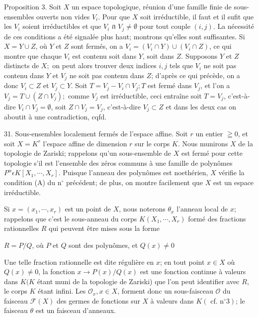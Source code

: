 Proposition $3 .$ Soit $X$ un espace topologique, réunion d'une famille finie de sous-ensembles ouverts non vides $V_{i} .$ Pour que $X$ soit irréductible, il faut et il sufit que les $V_{i}$ soient irréductibles et que $V_{i}$ ก $V_{j} \neq \emptyset$ pour tout couple $(i, j)$. La nécessité de ces conditions a été signalée plus haut; montrons qu'elles sont suffisantes. Si $X=Y \cup Z$, où $Y$ et $Z$ sont fermés, on a $V_{i}=\left(V_{i} \cap Y\right) \cup\left(V_{i} \cap Z\right)$, ce qui montre que chaque $V_{i}$ est contenu soit dans $Y$, soit dans $Z$. Supposons $Y$ et $Z$ distincts de $X ;$ on peut alors trouver deux indices $i, j$ tels que $V_{i}$ ne soit pas contenu dans $Y$ et $V_{j}$ ne soit pas contenu dans $Z$; d'après ce qui précède, on a donc $V_{i} \subset Z$ et $V_{j} \subset Y$. Soit $T=V_{j}-V_{i} \cap V_{j} ; T$ est fermé dans $V_{j}$, et l'on a $V_{j}=T \cup\left(Z \cap V_{j}\right) ;$ comme $V_{j}$ est irréductible, ceci entraîne soit $T=V_{j}$, c'est-à-dire $V_{i} \cap V_{j}=\emptyset$, soit $Z \cap V_{j}=V_{j}$, c'est-à-dire $V_{j} \subset Z$ et dans les deux cas on aboutit à une contradiction, cqfd.

31. Sous-ensembles localement fermés de l'espace affine. Soit $r$ un entier $\geqq 0$, et soit $X=K^{r}$ l'espace affine de dimension $r$ sur le corps $K$. Nous munirons $X$ de la topologie de Zariski; rappelons qu'un sous-ensemble de $X$ est fermé pour cette topologie s'il est l'ensemble des zéros communs à une famille de polynômes $P^{\alpha} \epsilon K\left[X_{1}, \cdots, X_{r}\right] .$ Puisque l'anneau des polynômes est noethérien, $X$ vérifie la condition (A) du $\mathrm{n}^{\circ}$ précédent; de plus, on montre facilement que $X$ est un espace irréductible.

Si $x=\left(x_{1}, \cdots, x_{r}\right)$ est un point de $X$, nous noterons $\theta_{x}$ l'anneau local de $x$; rappelons que c'est le sous-anneau du corps $K\left(X_{1}, \cdots, X_{r}\right)$ formé des fractions rationnelles $R$ qui peuvent être mises sous la forme

$R=P / Q$, où $P$ et $Q$ sont des polynômes, et $Q(x) \neq 0$

Une telle fraction rationnelle est dite régulière en $x$; en tout point $x \in X$ où $Q(x) \neq 0$, la fonction $x \rightarrow P(x) / Q(x)$ est une fonction continue à valeurs dans $K(K$ étant muni de la topologie de Zariski) que l'on peut identifier avec $R$, le corps $K$ étant infini. Les $\mathcal{O}_{x}, x \in X$, forment donc un sous-faisceau $\mathcal{O}$ du faisceau $\mathcal{F}(X)$ des germes de fonctions sur $X$ à valeurs dans $K\left(\right.$ cf. $\left.\mathrm{n}^{\circ} 3\right)$; le faisceau $\theta$ est un faisceau d'anneaux.

